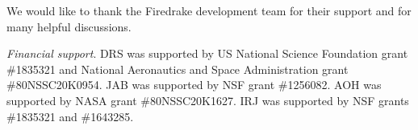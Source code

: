 \documentclass[journal abbreviation, manuscript]{copernicus}
\begin{document}
\appendixfigures  %

\appendixtables   %






\begin{acknowledgements}
We would like to thank the Firedrake development team for their support and for many helpful discussions.
\end{acknowledgements}

\textit{Financial support}.
DRS was supported by US National Science Foundation grant \#1835321 and National Aeronautics and Space Administration grant \#80NSSC20K0954.
JAB was supported by NSF grant \#1256082.
AOH was supported by NASA grant \#80NSSC20K1627.
IRJ was supported by NSF grants \#1835321 and \#1643285.












\end{document}
